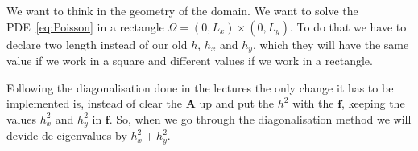 \documentclass[fontsize=11pt,paper=a4,titlepage]{report}
\begin{document}



We want to think in the geometry of the domain. We want to solve the
PDE~\ref{eq:Poisson} in a rectangle $\Omega = (0, L_x) \times (0, L_y)$. To do
that we have to declare two length instead of our old $h$, $h_x$ and $h_y$,
which they will have the same value if we work in a square and different values
if we work in a rectangle.

Following the diagonalisation done in the lectures the only change it has to be
implemented is, instead of clear the $\mathbf{A}$ up and put the $h^2$ with the 
$\mathbf{f}$, 
keeping the values $h_x^2$ and $h_y^2$ in $\mathbf{f}$. So, when we go through 
the diagonalisation method we will devide de eigenvalues by $h_x^2 + h_y^2$.

\end{document}
